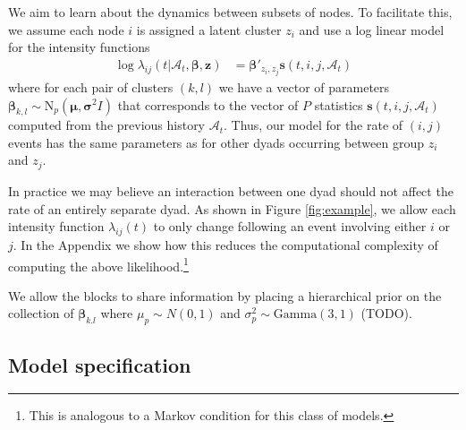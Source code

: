 \documentclass{article}
\begin{document}

We aim to learn about the dynamics between subsets of nodes.   To facilitate this, we assume each node $i$ is assigned a latent cluster $z_i$ and use a log linear model for the intensity functions
\begin{align*}
\log \lambda_{ij}(t | \mathcal{A}_t,\mathbf{\beta},\mathbf{z}) &= \boldsymbol{\beta}'_{z_i,z_j} \mathbf{s}(t,i,j,\mathcal{A}_t)
\end{align*}
where for each pair of clusters $(k,l)$ we have a vector of parameters $\boldsymbol{\beta}_{k,l} \sim \mbox{N}_p(\boldsymbol{\mu},\boldsymbol{\sigma}^2I)$ that corresponds to the vector of $P$ statistics $\mathbf{s}(t,i,j,\mathcal{A}_t)$ computed from the previous history $\mathcal{A}_t$.  Thus, our model for the rate of $(i,j)$ events has the same parameters as for other dyads occurring between group $z_i$ and $z_j$.  

 In practice we may believe an interaction between one dyad should not affect the rate of an entirely separate dyad.  As shown in Figure \ref{fig:example}, we allow each intensity function $\lambda_{ij}(t)$ to only change following an event involving either $i$ or $j$.  In the Appendix we show how this reduces the computational complexity of computing the above likelihood.\footnote{This is analogous to a Markov condition for this class of models.}

We allow the blocks to share information by placing a hierarchical prior on the collection of $\boldsymbol{\beta}_{k.l}$ where $\mu_p \sim N(0,1)$ and $\sigma_p^2 \sim \mbox{Gamma}(3,1)$ (TODO). 

\subsection{Model specification}
  
\end{document}
